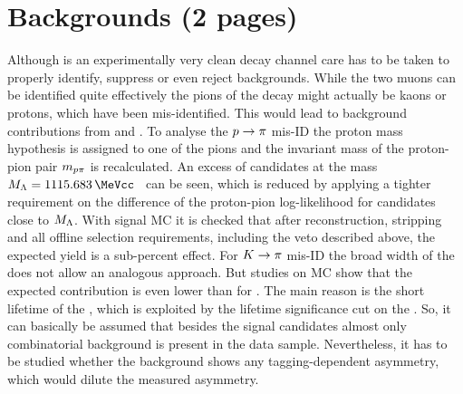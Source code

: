 
\section{Backgrounds (2 pages)}
\label{sec:bd2jpsiks:backgrounds}

Although \BdToJPsiKS is an experimentally very clean decay channel care has to
be taken to properly identify, suppress or even reject backgrounds. While the
two muons can be identified quite effectively the pions of the \KS decay might
actually be kaons or protons, which have been mis-identified. This would lead
to background contributions from \BdToJPsiKst and \LbToJPsiL. To analyse the
${p} \rightarrow {\ensuremath{\pi}}$ mis-ID the proton mass hypothesis is assigned to one of
the pions and the invariant mass of the proton-pion pair $m_{{p}{\pi}}$ is
recalculated. An excess of candidates at the \Lz mass $M_{\Lz} =
\SI{1115.683}{\MeVcc}$~\cite{PDG2014} can be seen, which is reduced by applying
a tighter requirement on the difference of the proton-pion log-likelihood for
candidates close to $M_{{\Lambda}}$. With \LbToJPsiL signal MC it is checked that
after reconstruction, stripping and all offline selection requirements,
including the veto described above, the expected yield is a sub-percent
effect. For ${K} \rightarrow {\ensuremath{\pi}}$ mis-ID the broad width of the \Kstarz does not
allow an analogous approach. But studies on \BdToJPsiKst MC show that the
expected contribution is even lower than for \LbToJPsiL. The main reason is
the short lifetime of the \Kstarz, which is exploited by the lifetime
significance cut on the \KS. So, it can basically be assumed that besides the
signal candidates almost only combinatorial background is present in the data
sample. Nevertheless, it has to be studied whether the background shows any
tagging-dependent asymmetry, which would dilute the measured \CP asymmetry.

